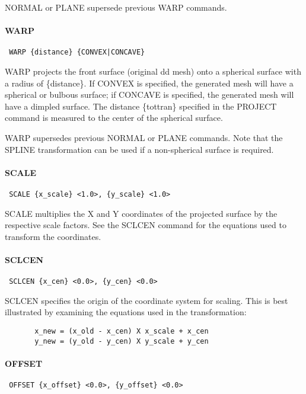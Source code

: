 NORMAL or PLANE supersede previous WARP commands.
\paragraph{WARP}
\begin{verbatim}
 WARP {distance} {CONVEX|CONCAVE}
\end{verbatim}

WARP projects the front surface (original dd mesh) onto a spherical
surface with a radius of \{distance\}.  If CONVEX is specified, the
generated mesh will have a spherical or bulbous surface; if CONCAVE is
specified, the generated mesh will have a dimpled surface.  The distance
\{tottran\} specified in the PROJECT command is measured to the center of
the spherical surface.

WARP supersedes previous NORMAL or PLANE commands.  Note that the SPLINE
transformation can be used if a non-spherical surface is required.
\paragraph{SCALE}
\begin{verbatim}
 SCALE {x_scale} <1.0>, {y_scale} <1.0>
\end{verbatim}

SCALE multiplies the X and Y coordinates of the projected
surface by the respective scale factors.  See the SCLCEN command for the
equations used to transform the coordinates.
\paragraph{SCLCEN}
\begin{verbatim}
 SCLCEN {x_cen} <0.0>, {y_cen} <0.0>
\end{verbatim}

SCLCEN specifies the origin of the coordinate system for scaling.  This
is best illustrated by examining the equations used in the
transformation:

\begin{verbatim}
       x_new = (x_old - x_cen) X x_scale + x_cen
       y_new = (y_old - y_cen) X y_scale + y_cen
\end{verbatim}

\paragraph{OFFSET}
\begin{verbatim}
 OFFSET {x_offset} <0.0>, {y_offset} <0.0>
\end{verbatim}

